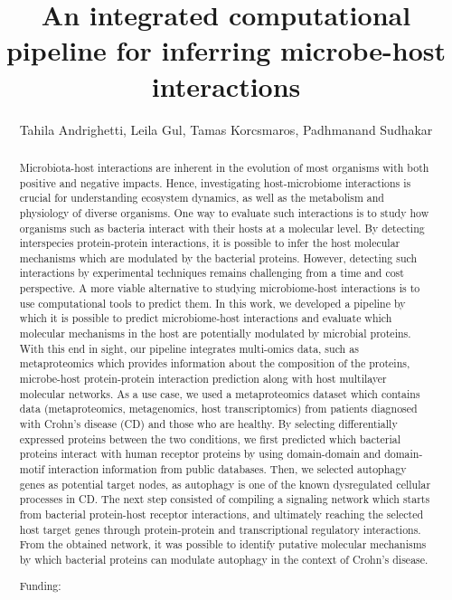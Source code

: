 \documentclass[twoside]{article}
\title{\vspace{-15mm}\fontsize{24pt}{10pt}\selectfont\textbf{ An integrated computational pipeline for inferring microbe-host interactions }} %
\author{ Tahila Andrighetti, Leila Gul, Tamas Korcsmaros, Padhmanand Sudhakar }
\affil{ Earlham Institute }
\date{}
\begin{document}
  
  
  \maketitle %
  
  
  \thispagestyle{fancy} %
  
  
  \begin{abstract}
  Microbiota-host interactions are inherent in the evolution of most organisms with both positive and negative impacts. Hence,  investigating host-microbiome interactions is crucial for understanding ecosystem dynamics,  as well as the metabolism and physiology of diverse organisms. One way to evaluate such interactions is to study how organisms such as bacteria interact with their hosts at a molecular level. By detecting interspecies protein-protein interactions,  it is possible to infer the host molecular mechanisms which are modulated by the bacterial proteins. However,  detecting such interactions by experimental techniques remains challenging from a time and cost perspective. A more viable alternative to studying microbiome-host interactions is to use computational tools to predict them. In this work,  we developed a pipeline by which it is possible to predict microbiome-host interactions and evaluate which molecular mechanisms in the host are potentially modulated by microbial proteins. With this end in sight,  our pipeline integrates multi-omics data,  such as metaproteomics which provides information about the composition of the proteins,  microbe-host protein-protein interaction prediction along with host multilayer molecular networks. As a use case,  we used a metaproteomics dataset which contains data (metaproteomics,  metagenomics,  host transcriptomics) from patients diagnosed with Crohn’s disease (CD) and those who are healthy. By selecting differentially expressed proteins between the two conditions,  we first predicted which bacterial proteins interact with human receptor proteins by using domain-domain and domain-motif interaction information from public databases. Then,  we selected autophagy genes as potential target nodes,  as autophagy is one of the known dysregulated cellular processes in CD. The next step consisted of compiling a signaling network which starts from bacterial protein-host receptor interactions,  and ultimately reaching the selected host target genes through protein-protein and transcriptional regulatory interactions. From the obtained network,   it was possible to identify putative molecular mechanisms by which bacterial proteins can modulate autophagy in the context of Crohn’s disease.
  
  Funding:  \\ 
  \end{abstract}
  
\end{document}
